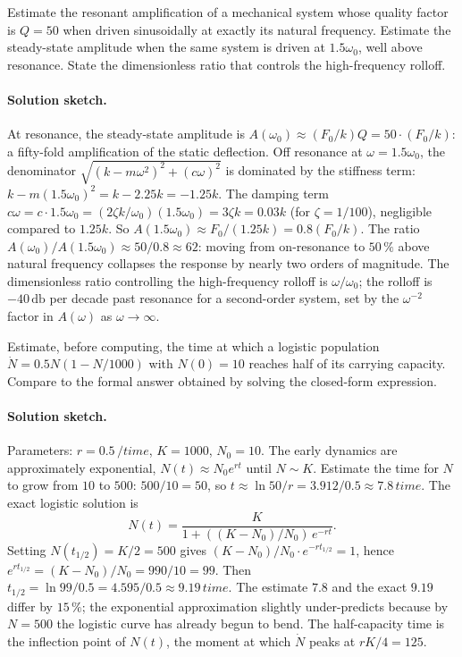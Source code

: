 \begin{exercise}
Estimate the resonant amplification of a mechanical system whose
quality factor is $Q = 50$ when driven sinusoidally at exactly
its natural frequency. Estimate the steady-state amplitude when
the same system is driven at $1.5\omega_{0}$, well above
resonance. State the dimensionless ratio that controls the
high-frequency rolloff.

\paragraph{Solution sketch.} At resonance, the steady-state
amplitude is $A(\omega_{0}) \approx (F_{0}/k) Q = 50 \cdot
(F_{0}/k)$: a fifty-fold amplification of the static deflection.
Off resonance at $\omega = 1.5 \omega_{0}$, the denominator
$\sqrt{(k - m \omega^{2})^{2} + (c \omega)^{2}}$ is dominated by
the stiffness term: $k - m (1.5 \omega_{0})^{2} = k - 2.25 k =
-1.25 k$. The damping term $c \omega = c \cdot 1.5 \omega_{0} =
(2 \zeta k/\omega_{0})(1.5 \omega_{0}) = 3 \zeta k = 0.03 k$ (for
$\zeta = 1/100$), negligible compared to $1.25 k$. So
$A(1.5 \omega_{0}) \approx F_{0}/(1.25 k) = 0.8 (F_{0}/k)$. The
ratio $A(\omega_{0})/A(1.5 \omega_{0}) \approx 50/0.8 \approx 62$:
moving from on-resonance to $50\,\%$ above natural frequency
collapses the response by nearly two orders of magnitude. The
dimensionless ratio controlling the high-frequency rolloff is
$\omega/\omega_{0}$; the rolloff is $-40\,\si{\decibel}$ per
decade past resonance for a second-order system, set by the
$\omega^{-2}$ factor in $A(\omega)$ as $\omega \to \infty$.
\end{exercise}

\begin{exercise}
Estimate, before computing, the time at which a logistic
population $\dot{N} = 0.5 N (1 - N/1000)$ with $N(0) = 10$
reaches half of its carrying capacity. Compare to the formal
answer obtained by solving the closed-form expression.

\paragraph{Solution sketch.} Parameters: $r = 0.5\,\si{\per
\unit{time}}$, $K = 1000$, $N_{0} = 10$. The early dynamics are
approximately exponential, $N(t) \approx N_{0} e^{r t}$ until
$N \sim K$. Estimate the time for $N$ to grow from $10$ to $500$:
$500/10 = 50$, so $t \approx \ln 50 / r = 3.912 / 0.5 \approx
7.8\,\si{\unit{time}}$. The exact logistic solution is
\[
N(t) = \frac{K}{1 + ((K - N_{0})/N_{0})\, e^{-r t}}.
\]
Setting $N(t_{1/2}) = K/2 = 500$ gives $(K - N_{0})/N_{0} \cdot
e^{-r t_{1/2}} = 1$, hence $e^{r t_{1/2}} = (K - N_{0})/N_{0} =
990/10 = 99$. Then $t_{1/2} = \ln 99 / 0.5 = 4.595 / 0.5 \approx
9.19\,\si{\unit{time}}$. The estimate $7.8$ and the exact $9.19$
differ by $15\,\%$; the exponential approximation slightly
under-predicts because by $N = 500$ the logistic curve has
already begun to bend. The half-capacity time is the inflection
point of $N(t)$, the moment at which $\dot{N}$ peaks at $r K/4 =
125$.
\end{exercise}

